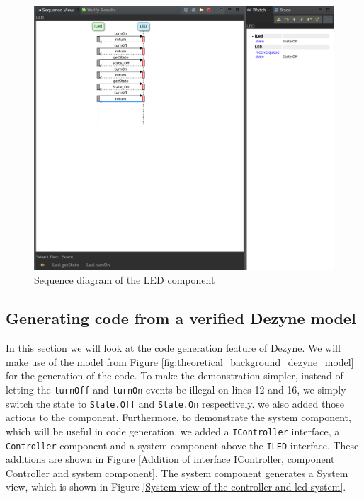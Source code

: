 \documentclass[12pt]{scrreprt}
\begin{document}
\begin{figure}[H]
    \centering
    \includegraphics[width=\textwidth]{Figures/theoretical_background/simulation_of_led.png}
    \caption{Sequence diagram of the LED component}
    \label{Sequence diagram of the LED component}
\end{figure}


\subsection{Generating code from a verified Dezyne model}
\label{Generating code from a verified Dezyne model}
    In this section we will look at the code generation feature of Dezyne. We will make use of the model from Figure \ref{fig:theoretical_background_dezyne_model} for the generation of the code. To make the demonstration simpler, instead of letting the \texttt{turnOff} and \texttt{turnOn} events be illegal on lines 12 and 16, we simply switch the state to \texttt{State.Off} and \texttt{State.On} respectively. we also added those actions to the component. Furthermore, to demonstrate the system component, which will be useful in code generation, we added a \texttt{IController} interface, a \texttt{Controller} component and a system component above the \texttt{ILED} interface. These additions are shown in Figure \ref{Addition of interface IController, component Controller and system component}. The system component generates a System view, which is shown in Figure \ref{System view of the controller and led system}.
    
\end{document}
